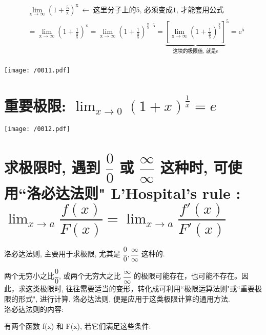 \documentclass[UTF8]{ctexart}
\begin{document}
\begin{tcolorbox}[title = {例},boxrule={0.1em},colframe={black!10}, colback={black!3},colbacktitle={black!10},coltitle={black}]
	\begin{align*}  %
		&\lim_{\text{x}\rightarrow \infty}\left( 1+\frac{5}{\text{x}} \right) ^{\text{x}}\ \gets \ \text{这里分子上的5,\ 必须变成1,\ 才能套用公式}\\
		&=\lim_{\text{x}\rightarrow \infty}\left( 1+\frac{1}{\frac{\text{x}}{5}} \right) ^{\text{x}}=\lim_{\text{x}\rightarrow \infty}\left( 1+\frac{1}{\frac{\text{x}}{5}} \right) ^{\frac{\text{x}}{5}\cdot 5}=\underset{\text{这块的极限值,\ 就是e}}{\underbrace{\left[ \lim_{\text{x}\rightarrow \infty}\left( 1+\frac{1}{\frac{\text{x}}{5}} \right) ^{\frac{\text{x}}{5}} \right] }}^5=\text{e}^5\\
	\end{align*}
	
	\texttt{[image: /0011.pdf]}
\end{tcolorbox}





\section{重要极限: $ \boxed{\lim_{x \to 0} (1+x)^{\frac{1} {x}} =e} $}

\texttt{[image: /0012.pdf]}





\section{求极限时, 遇到 $ \dfrac{0}{0}$ 或 $\dfrac{\infty} {\infty}$ 这种时, 可使用``洛必达法则" L'Hospital's rule : $ \boxed{	\lim_{x → a}\dfrac{f(x)}{F(x)}=\lim_{x\rightarrow a}\dfrac{f'(x)}{F'(x)}}$}

洛必达法则, 主要用于求极限, 尤其是 $ \dfrac{0}{0}, \dfrac{\infty} {\infty}$ 这种的.

两个无穷小之比$ \dfrac{0}{0}$, 或两个无穷大之比 $\dfrac{\infty} {\infty}$ 的极限可能存在，也可能不存在。因此，求这类极限时, 往往需要适当的变形，转化成可利用``极限运算法则"或``重要极限的形式", 进行计算. 洛必达法则, 便是应用于这类极限计算的通用方法. \\

洛必达法则的内容: 

有两个函数 f(x) 和 F(x), 若它们满足这些条件:
\end{document}
